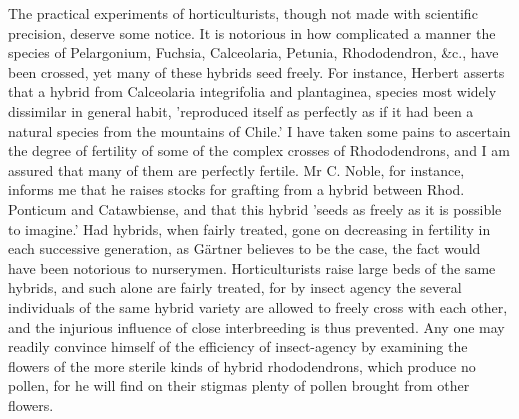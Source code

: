 \indent The practical experiments of horticulturists, though not made with scientific precision, deserve some notice. It is notorious in how complicated a manner the species of Pelargonium, Fuchsia, Calceolaria, Petunia, Rhododendron, \&c., have been crossed, yet many of these hybrids seed freely. For instance, Herbert asserts that a hybrid from Calceolaria integrifolia and plantaginea, species most widely dissimilar in general habit, 'reproduced itself as perfectly as if it had been a natural species from the mountains of Chile.' I have taken some pains to ascertain the degree of fertility of some of the complex crosses of Rhododendrons, and I am assured that many of them are perfectly fertile. Mr C. Noble, for instance, informs me that he raises stocks for grafting from a hybrid between Rhod. Ponticum and Catawbiense, and that this hybrid 'seeds as freely as it is possible to imagine.' Had hybrids, when fairly treated, gone on decreasing in fertility in each successive generation, as G\"{a}rtner believes to be the case, the fact would have been notorious to nurserymen. Horticulturists raise large beds of the same hybrids, and such alone are fairly treated, for by insect agency the several individuals of the same hybrid variety are allowed to freely cross with each other, and the injurious influence of close interbreeding is thus prevented. Any one may readily convince himself of the efficiency of insect-agency by examining the flowers of the more sterile kinds of hybrid rhododendrons, which produce no pollen, for he will find on their stigmas plenty of pollen brought from other flowers.\\

